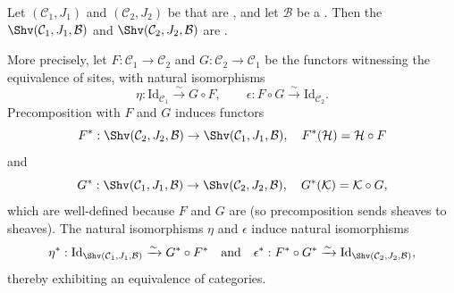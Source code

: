 \begin{lemma} \label{lemma:equivalence_of_sheaf_categories_under_equivalent_sites}
Let $(\mathcal{C}_1, J_1)$ and $(\mathcal{C}_2, J_2)$ be  that are , and let $\mathcal{B}$ be a . Then the  $\Shv(\mathcal{C}_1, J_1, \mathcal{B})$ and $\Shv(\mathcal{C}_2, J_2, \mathcal{B})$ are .

More precisely, let $F: \mathcal{C}_1 \to \mathcal{C}_2$ and $G: \mathcal{C}_2 \to \mathcal{C}_1$ be the functors witnessing the equivalence of sites, with natural isomorphisms
$$\eta: \mathrm{Id}_{\mathcal{C}_1} \xrightarrow{\sim} G \circ F, \qquad \epsilon: F \circ G \xrightarrow{\sim} \mathrm{Id}_{\mathcal{C}_2}.$$
Precomposition with $F$ and $G$ induces functors
$$F^*: \Shv(\mathcal{C}_2, J_2, \mathcal{B}) \to \Shv(\mathcal{C}_1, J_1, \mathcal{B}), \quad F^*(\mathcal{H}) = \mathcal{H} \circ F$$
and
$$G^*: \Shv(\mathcal{C}_1, J_1, \mathcal{B}) \to \Shv(\mathcal{C}_2, J_2, \mathcal{B}), \quad G^*(\mathcal{K}) = \mathcal{K} \circ G,$$
which are well-defined because $F$ and $G$ are  (so precomposition sends sheaves to sheaves). The natural isomorphisms $\eta$ and $\epsilon$ induce natural isomorphisms
$$\eta^*: \mathrm{Id}_{\Shv(\mathcal{C}_1, J_1, \mathcal{B})} \xrightarrow{\sim} G^* \circ F^* \quad \text{and} \quad \epsilon^*: F^* \circ G^* \xrightarrow{\sim} \mathrm{Id}_{\Shv(\mathcal{C}_2, J_2, \mathcal{B})},$$
thereby exhibiting an equivalence of categories.
\end{lemma}